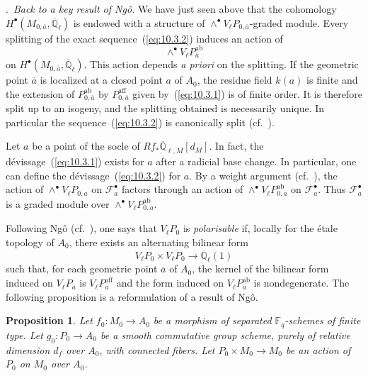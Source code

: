 \documentclass[12pt,a4paper,oneside,english,leqno]{smfart}
\makeatletter
\numberwithin{equation}{subsection}
\newcounter{theo}
\numberwithin{theo}{subsection}
\newenvironment{paragr}[1][]{\medskip\refstepcounter{subsection}%
  \par\noindent\hspace*{\parindent}\thesubsection.\ \emph{#1}%
  \@ifundefined{@empty}{}{}\ignorespaces}{\medskip}
\theoremstyle{plain}
\newtheorem{proposition}[theo]{Proposition}
\theoremstyle{definition}
\theoremstyle{remark}
\newcommand{\QQ}{\mathbb{Q}}
\newcommand{\Fq}{\mathbb{F}_q}
\newcommand{\Qlb}{\overline{\mathbb{Q}}_{\ell}}
\newcommand{\fc}{\mathcal{F}}
\makeatother
\begin{document}
\begin{paragr}[Back to a key result of Ngô.]
We have just seen above that the cohomology $H^\bullet(M_{0,\overline{a}},\Qlb)$ is endowed with a structure of $\wedge^\bullet V_\ell P_{0,\overline{a}}$-graded module. Every splitting of the exact sequence~(\ref{eq:10.3.2}) induces an action of
$$\wedge^\bullet V_\ell P_{\overline{a}}^{\mathrm{ab}}$$
on $H^\bullet(M_{0,\overline{a}},\Qlb)$. This action depends \emph{a priori} on the splitting. If the geometric point $\overline{a}$ is localized at a closed point $a$ of $A_0$, the residue field $k(a)$ is finite and the extension of $P_{0,\overline{a}}^{\mathrm{ab}}$ by $P_{0,\overline{a}}^{\mathrm{aff}}$ given by~(\ref{eq:10.3.1}) is of finite order. It is therefore split up to an isogeny, and the splitting obtained is necessarily unique. In particular the sequence~(\ref{eq:10.3.2}) is canonically split (cf.\ \cite[prop.\ 7.5.3]{Ngo-lemme}).

Let $a$ be a point of the socle of $Rf_*\overline{\QQ}_{\ell,M}[d_M]$. In fact, the dévissage~(\ref{eq:10.3.1}) exists for $a$ after a radicial base change. In particular, one can define the dévissage~(\ref{eq:10.3.2}) for $a$. By a weight argument (cf.\ \cite[\S7.4.8]{Ngo-lemme}), the action of $\wedge^\bullet V_\ell P_{0,a}$ on $\fc_a^\bullet$ factors through an action of $\wedge^\bullet V_\ell P_{0,a}^{\mathrm{ab}}$ on $\fc_a^\bullet$. Thus $\fc_a^\bullet$ is a graded module over $\wedge^\bullet V_\ell P_{0,a}^{\mathrm{ab}}$.

Following Ngô (cf.\ \cite[\S7.1.4]{Ngo-lemme}), one says that $V_\ell P_0$ is \emph{polarisable} if, locally for the étale topology of $A_0$, there exists an alternating bilinear form
$$V_\ell P_0\times V_\ell P_0\to\Qlb(1)$$
such that, for each geometric point $\overline{a}$ of $A_0$, the kernel of the bilinear form induced on $V_\ell P_{\overline{a}}$ is $V_\ell P_{\overline{a}}^{\mathrm{aff}}$ and the form induced on $V_\ell P_{\overline{a}}^{\mathrm{ab}}$ is nondegenerate. The following proposition is a reformulation of a result of Ngô.

\begin{proposition}\label{thm:10.3.1}
Let $f_0 : M_0\to A_0$ be a morphism of separated $\Fq$-schemes of finite type. Let $g_0 : P_0\to A_0$ be a smooth commutative group scheme, purely of relative dimension $d_f$ over $A_0$, with connected fibers. Let $P_0\times M_0\to M_0$ be an action of $P_0$ on $M_0$ over $A_0$.


\end{proposition}
\end{paragr}
\end{document}
